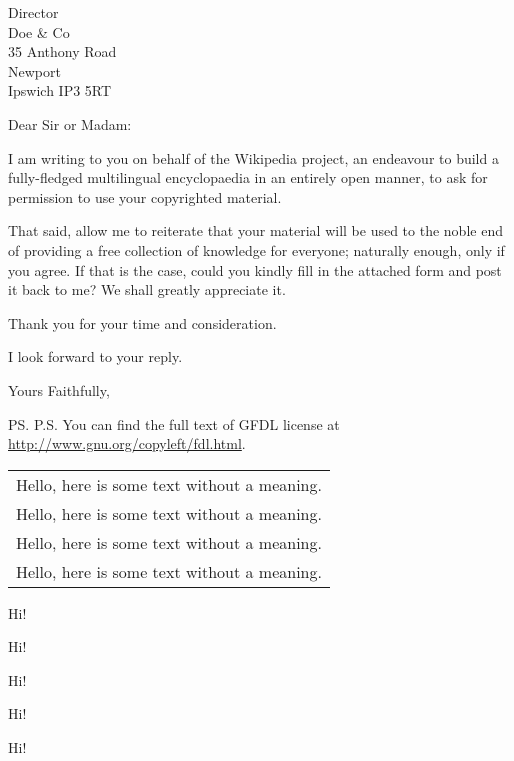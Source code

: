 \documentclass{antique}
\date{June 2024}
\newcommand{\blindtext}{Hello, here is some text without a meaning.}
\begin{document}
\begin{letter}{Director \\ Doe \& Co \\ 35 Anthony Road
    \\ Newport \\ Ipswich IP3 5RT}
    \opening{Dear Sir or Madam:}
    
    I am writing to you on behalf of the Wikipedia project,
    an endeavour to build a fully-fledged multilingual encyclopaedia in an entirely
    open manner, to ask for permission to use your copyrighted material.


    That said, allow me to reiterate that your material will be used to the noble end of
    providing a free collection of knowledge for everyone; naturally enough, only if you
    agree. If that is the case, could you kindly fill in the attached form and post it
    back to me? We shall greatly appreciate it.

    Thank you for your time and consideration.

    I look forward to your reply.
    
    \closing{Yours Faithfully,}
    
    \ps{P.S. You can find the full text of GFDL license at \url{http://www.gnu.org/copyleft/fdl.html}.}
    

    \clearpage

    \begin{xltabular}{0.75\linewidth}{X}
        \blindtext\\
        \blindtext\\
        \blindtext\\
        \blindtext\\
    \end{xltabular}

    \clearpage

    Hi!

    \clearpage

    Hi!

    \clearpage

    Hi!

    \clearpage

    Hi!

    \clearpage

    Hi!

    \clearpage


\end{letter}
\end{document}
